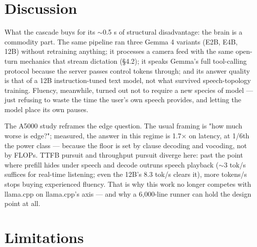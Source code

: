 \documentclass[journal]{IEEEtran}
\begin{document}
\section{Discussion}
What the cascade buys for its $\sim$0.5 s of structural disadvantage: the brain is a commodity part. The same pipeline ran three Gemma 4 variants (E2B, E4B, 12B) without retraining anything; it processes a camera feed with the same open-turn mechanics that stream dictation (§4.2); it speaks Gemma's full tool-calling protocol because the server passes control tokens through; and its answer quality is that of a 12B instruction-tuned text model, not what survived speech-topology training. Fluency, meanwhile, turned out not to require a new species of model — just refusing to waste the time the user's own speech provides, and letting the model place its own pauses.

The A5000 study reframes the edge question. The usual framing is "how much worse is edge?"; measured, the answer in this regime is 1.7× on latency, at 1/6th the power class — because the floor is set by clause decoding and vocoding, not by FLOPs. TTFB pursuit and throughput pursuit diverge here: past the point where prefill hides under speech and decode outruns speech playback ($\sim$3 tok/s suffices for real-time listening; even the 12B's 8.3 tok/s clears it), more tokens/s stops buying experienced fluency. That is why this work no longer competes with llama.cpp on llama.cpp's axis — and why a 6,000-line runner can hold the design point at all.

\section{Limitations}
\end{document}

